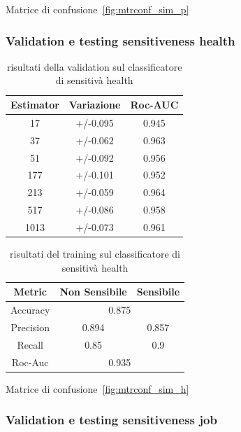 Matrice di confusione~\ref{fig:mtrconf_sim_p}

\subsubsection{Validation e testing sensitiveness health}
\label{sssec:val_testing_health}

\begin{table}[h]
\label{tbl:val_sens_health}
\centering
\begin{tabular}{|c|c|c|}
\hline
\textbf{Estimator} & \textbf{Variazione} & \textbf{Roc-AUC} \\ \hline
17 & +/-0.095 & 0.945 \\ \hline
37 & +/-0.062 & 0.963 \\ \hline
51 & +/-0.092 & 0.956 \\ \hline
177 & +/-0.101 & 0.952 \\ \hline
213 & +/-0.059 & 0.964 \\ \hline
517 & +/-0.086 & 0.958 \\ \hline
1013 & +/-0.073 & 0.961 \\ \hline
\end{tabular}
\caption{risultati della validation sul classificatore di sensitivà health}
\end{table}
\FloatBarrier

\begin{table}[h]
\label{tbl:training_sens_health}
\centering
\begin{tabular}{|c|c|c|}
\hline
\textbf{Metric} & \textbf{Non Sensibile} & \textbf{Sensibile} \\ \hline
Accuracy & \multicolumn{2}{c|}{0.875} \\ \hline
Precision & 0.894 & 0.857 \\ \hline
Recall & 0.85 & 0.9 \\ \hline
Roc-Auc & \multicolumn{2}{c|}{0.935} \\ \hline
\end{tabular}
\caption{risultati del training sul classificatore di sensitivà health}
\end{table}
\FloatBarrier

Matrice di confusione~\ref{fig:mtrconf_sim_h}

\subsubsection{Validation e testing sensitiveness job}
\label{sssec:val_testing_job}

